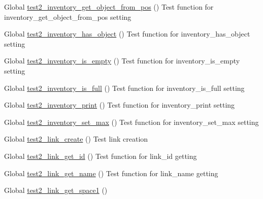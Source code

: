 \begin{DoxyRefList}
\item[Global \mbox{\hyperlink{inventory__test_8c_aecee02df51d07e7ebfa5d0512a3b0cb0}{test2\+\_\+inventory\+\_\+get\+\_\+object\+\_\+from\+\_\+pos}} ()]\label{test__test000056}%
%
Test function for inventory\+\_\+get\+\_\+object\+\_\+from\+\_\+pos setting  
\item[Global \mbox{\hyperlink{inventory__test_8c_a7b74f975c41051fab9f54bc1e84ec545}{test2\+\_\+inventory\+\_\+has\+\_\+object}} ()]\label{test__test000072}%
%
Test function for inventory\+\_\+has\+\_\+object setting  
\item[Global \mbox{\hyperlink{inventory__test_8c_a4d2a2a4d4ba59446d013debfe9bf05dc}{test2\+\_\+inventory\+\_\+is\+\_\+empty}} ()]\label{test__test000068}%
%
Test function for inventory\+\_\+is\+\_\+empty setting  
\item[Global \mbox{\hyperlink{inventory__test_8c_a1c9e567d4919d5aaccc9580815a8a81d}{test2\+\_\+inventory\+\_\+is\+\_\+full}} ()]\label{test__test000066}%
%
Test function for inventory\+\_\+is\+\_\+full setting  
\item[Global \mbox{\hyperlink{inventory__test_8c_ab416dcaf2ae0f9852a8c6ed5eea4f408}{test2\+\_\+inventory\+\_\+print}} ()]\label{test__test000070}%
%
Test function for inventory\+\_\+print setting  
\item[Global \mbox{\hyperlink{inventory__test_8c_a283a52426a084b058f3f932a47c16f7d}{test2\+\_\+inventory\+\_\+set\+\_\+max}} ()]\label{test__test000062}%
%
Test function for inventory\+\_\+set\+\_\+max setting  
\item[Global \mbox{\hyperlink{link__test_8c_a24b5463da176c3e578b0a0fa8bb1f9f0}{test2\+\_\+link\+\_\+create}} ()]\label{test__test000074}%
%
Test link creation  
\item[Global \mbox{\hyperlink{link__test_8c_a0f967a1782dd7264e73ad428d22d125d}{test2\+\_\+link\+\_\+get\+\_\+id}} ()]\label{test__test000087}%
%
Test function for link\+\_\+id getting  
\item[Global \mbox{\hyperlink{link__test_8c_a4efc6cfcdc210e2803f9d285734c571e}{test2\+\_\+link\+\_\+get\+\_\+name}} ()]\label{test__test000089}%
%
Test function for link\+\_\+name getting  
\item[Global \mbox{\hyperlink{link__test_8c_ac6eb2a7951a5c7eb9ef3706dec2195b2}{test2\+\_\+link\+\_\+get\+\_\+space1}} ()]\label{test__test000091}%

\end{DoxyRefList}
